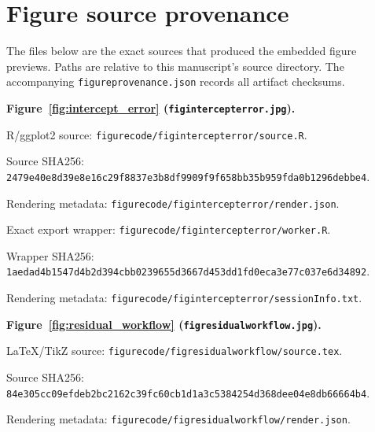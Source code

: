 \documentclass[11pt]{article}
\begin{document}
\section*{Figure source provenance}
The files below are the exact sources that produced the embedded figure previews. Paths are relative to this manuscript's source directory. The accompanying \texttt{figureprovenance.json} records all artifact checksums.\par
\medskip\noindent\textbf{Figure~\ref{fig:intercept_error} (\texttt{figintercepterror.jpg}).}\par
\noindent R/ggplot2 source: \texttt{figurecode/\allowbreak{}figintercepterror/\allowbreak{}source.R}.\par
\noindent Source SHA256: \texttt{2479e40e\allowbreak{}8d39e8e1\allowbreak{}6c29f883\allowbreak{}7e3b8df9\allowbreak{}909f9f65\allowbreak{}8bb35b95\allowbreak{}9fda0b12\allowbreak{}96debbe4}.\par
\noindent Rendering metadata: \texttt{figurecode/\allowbreak{}figintercepterror/\allowbreak{}render.json}.\par
\noindent Exact export wrapper: \texttt{figurecode/\allowbreak{}figintercepterror/\allowbreak{}worker.R}.\par
\noindent Wrapper SHA256: \texttt{1aedad4b\allowbreak{}1547d4b2\allowbreak{}d394cbb0\allowbreak{}239655d3\allowbreak{}667d453d\allowbreak{}d1fd0eca\allowbreak{}3e77c037\allowbreak{}e6d34892}.\par
\noindent Rendering metadata: \texttt{figurecode/\allowbreak{}figintercepterror/\allowbreak{}sessionInfo.txt}.\par
\medskip\noindent\textbf{Figure~\ref{fig:residual_workflow} (\texttt{figresidualworkflow.jpg}).}\par
\noindent LaTeX/TikZ source: \texttt{figurecode/\allowbreak{}figresidualworkflow/\allowbreak{}source.tex}.\par
\noindent Source SHA256: \texttt{84e305cc\allowbreak{}09efdeb2\allowbreak{}bc2162c3\allowbreak{}9fc60cb1\allowbreak{}d1a3c538\allowbreak{}4254d368\allowbreak{}dee04e8d\allowbreak{}b66664b4}.\par
\noindent Rendering metadata: \texttt{figurecode/\allowbreak{}figresidualworkflow/\allowbreak{}render.json}.\par
\end{document}
